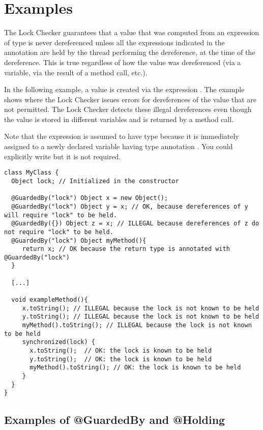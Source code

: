 \section{Examples\label{lock-examples}}

The Lock Checker guarantees that a value that was computed from an expression of  type is
never dereferenced unless all the expressions indicated in the
 annotation are held by the thread performing the
dereference, at the time of the dereference.  This is true regardless of how
the value was dereferenced (via a variable, via the result of a method call, etc.).

In the following example, a value is created via the expression
.  The example shows where the Lock Checker issues errors
for dereferences of the value that are not permitted.  The Lock Checker
detects these illegal dereferences even though the value is stored in
different variables and is returned by a method call.

Note that the expression  is assumed to have type 
because it is immediately assigned to a newly declared
variable having type annotation .  You could
explicitly write  but it is not
required.

\begin{Verbatim}
class MyClass {
  Object lock; // Initialized in the constructor

  @GuardedBy("lock") Object x = new Object();
  @GuardedBy("lock") Object y = x; // OK, because dereferences of y will require "lock" to be held.
  @GuardedBy({}) Object z = x; // ILLEGAL because dereferences of z do not require "lock" to be held.
  @GuardedBy("lock") Object myMethod(){
     return x; // OK because the return type is annotated with @GuardedBy("lock")
  }

  [...]

  void exampleMethod(){
     x.toString(); // ILLEGAL because the lock is not known to be held
     y.toString(); // ILLEGAL because the lock is not known to be held
     myMethod().toString(); // ILLEGAL because the lock is not known to be held
     synchronized(lock) {
       x.toString();  // OK: the lock is known to be held
       y.toString();  // OK: the lock is known to be held
       myMethod().toString(); // OK: the lock is known to be held
     }
  }
}
\end{Verbatim}


\subsection{Examples of @GuardedBy and @Holding\label{lock-examples-guardedby-and-holding}}

